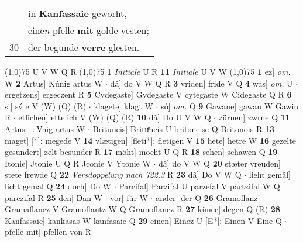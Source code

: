 \documentclass[8pt,a4paper,notitlepage]{article}
\begin{document}
\begin{table}[ht]
\begin{minipage}[t]{0.5\linewidth}
\begin{tabular}{rl}
 & in \textbf{Kanfassaie} geworht,\\ 
 & eine\textit{n} pfelle \textbf{mit} golde vesten;\\ 
30 & der begunde \textbf{verre} glesten.\\ 
\end{tabular}
\scriptsize
\line(1,0){75} \newline
U V W Q R \newline
\line(1,0){75} \newline
\textbf{1} \textit{Initiale} U R  \textbf{11} \textit{Initiale} U V W  \newline
\line(1,0){75} \newline
\textbf{1} ez] \textit{om.} W \textbf{2} Artus] Kúnig artus W  $\cdot$ dâ] do V W Q R \textbf{3} vriden] fride V Q \textbf{4} was] \textit{om.} U  $\cdot$ ergetzens] ergeczent R \textbf{5} Cydegaste] Gydegaste V cytegaste W Cidegaste Q R \textbf{6} si] sv́ e V (W) (Q) (R)  $\cdot$ klagete] klagt W  $\cdot$ sô] \textit{om.} Q \textbf{9} Gawane] gawan W Gawin R  $\cdot$ etlîchen] ettelich V (W) (Q) (R) \textbf{10} dâ] Do U V W Q  $\cdot$ zürnen] zwrne Q \textbf{11} Artus] ÷Vnig artus W  $\cdot$ Brituneis] Brituͦneis U britoneise Q Britonois R \textbf{13} maget] [*]: megede V \textbf{14} vlætigen] [fleti*]: fletigen V \textbf{15} hete] hetre W \textbf{16} gezelte gesundert] zelt besunder R \textbf{17} möht] mocht U Q R \textbf{18} sehen] schawen Q \textbf{19} Itonie] Jtonie U Q R Jconie V Ytonie W  $\cdot$ dâ] do V W Q \textbf{20} stæter vreuden] stete frewde Q \textbf{22} \textit{Versdoppelung nach 722.3} R  \textbf{23} dâ] Do V W Q  $\cdot$ lieht gemâl] licht gemal Q \textbf{24} doch] Do W  $\cdot$ Parcifal] Parzifal U parzefal V partzifal W Q parczifal R \textbf{25} den] Dan W  $\cdot$ vor] fúr W  $\cdot$ ander] der Q \textbf{26} Gramoflanz] Gramaflancz V Gramoflantz W Q Gramoflancz R \textbf{27} künec] degen Q (R) \textbf{28} Kanfassaie] kankasas W kanfasaie Q \textbf{29} einen] Einez U [E*]: Einen V Eine Q  $\cdot$ pfelle mit] pfellen von R \newline
\end{minipage}
\end{table}
\end{document}
